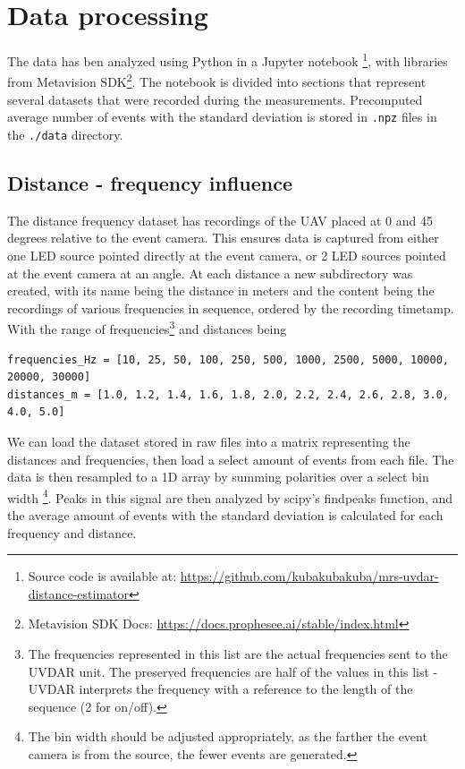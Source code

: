 
\chapter{Data processing\label{chap:data_processing}}

The data has ben analyzed using Python in a Jupyter notebook
\footnote{Source code is available at: \url{https://github.com/kubakubakuba/mrs-uvdar-distance-estimator}},
with libraries from Metavision SDK\footnote{Metavision SDK Docs: \url{https://docs.prophesee.ai/stable/index.html}}.
The notebook is divided into sections that represent several datasets that were recorded during the measurements.
Precomputed average number of events with the standard deviation is stored in \texttt{.npz} files in the \texttt{./data} directory.

\section{Distance - frequency influence}

The distance frequency dataset has recordings of the UAV placed at 0 and 45 degrees relative to the event camera. This ensures data is captured from either
one LED source pointed directly at the event camera, or 2 LED sources pointed at the event camera at an angle. At each distance a new subdirectory was
created, with its name being the distance in meters and the content being the recordings of various frequencies in sequence, ordered by the recording timetamp.
With the range of frequencies\footnote{The frequencies represented in this list are the actual frequencies sent to the UVDAR unit. The preserved frequencies
are half of the values in this list - UVDAR interprets the frequency with a reference to the length of the sequence (2 for on/off).} and distances being

\begin{lstlisting}
frequencies_Hz = [10, 25, 50, 100, 250, 500, 1000, 2500, 5000, 10000, 20000, 30000]
distances_m = [1.0, 1.2, 1.4, 1.6, 1.8, 2.0, 2.2, 2.4, 2.6, 2.8, 3.0, 4.0, 5.0]
\end{lstlisting}

We can load the dataset stored in raw files into a matrix representing the distances and frequencies, then load a select amount of events from each file.
The data is then resampled to a 1D array by summing polarities over a select bin width
\footnote{The bin width should be adjusted appropriately, as the farther the event camera is from the source, the fewer events are generated.}.
Peaks in this signal are then analyzed by scipy's findpeaks function,
and the average amount of events with the standard deviation is calculated for each frequency and distance.

